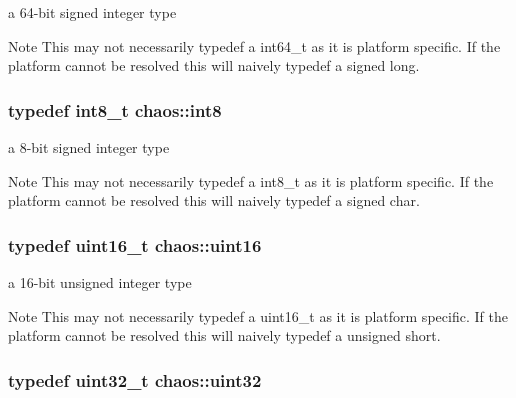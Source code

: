 a 64-\/bit signed integer type 

\begin{DoxyNote}{Note}
This may not necessarily {\ttfamily typedef} a {\ttfamily int64\-\_\-t} as it is platform specific. If the platform cannot be resolved this will naively {\ttfamily typedef} a {\ttfamily signed long}. 
\end{DoxyNote}
\hypertarget{namespacechaos_a56015674cfe4ad1fc583c3da6c724d8a}{
\subsubsection[{int8}]{\setlength{\rightskip}{0pt plus 5cm}typedef int8\-\_\-t {\bf chaos\-::int8}}}\label{namespacechaos_a56015674cfe4ad1fc583c3da6c724d8a}


a 8-\/bit signed integer type 

\begin{DoxyNote}{Note}
This may not necessarily {\ttfamily typedef} a {\ttfamily int8\-\_\-t} as it is platform specific. If the platform cannot be resolved this will naively {\ttfamily typedef} a {\ttfamily signed char}. 
\end{DoxyNote}
\hypertarget{namespacechaos_ac3888b1c9e56da7fbbdb3ab8425b4068}{
\subsubsection[{uint16}]{\setlength{\rightskip}{0pt plus 5cm}typedef uint16\-\_\-t {\bf chaos\-::uint16}}}\label{namespacechaos_ac3888b1c9e56da7fbbdb3ab8425b4068}


a 16-\/bit unsigned integer type 

\begin{DoxyNote}{Note}
This may not necessarily {\ttfamily typedef} a {\ttfamily uint16\-\_\-t} as it is platform specific. If the platform cannot be resolved this will naively {\ttfamily typedef} a {\ttfamily unsigned short}. 
\end{DoxyNote}
\hypertarget{namespacechaos_a3b3a47ba1e284655bf1a30c441121c60}{
\subsubsection[{uint32}]{\setlength{\rightskip}{0pt plus 5cm}typedef uint32\-\_\-t {\bf chaos\-::uint32}}}\label{namespacechaos_a3b3a47ba1e284655bf1a30c441121c60}


